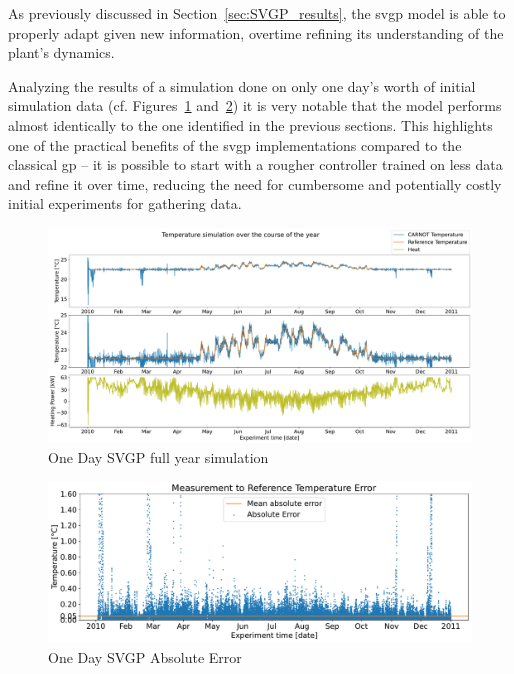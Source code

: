 As previously discussed in Section~\ref{sec:SVGP_results}, the \acrshort{svgp}
model is able to properly adapt given new information, overtime refining its
understanding of the plant's dynamics.

Analyzing the results of a simulation done on only one day's worth of initial
simulation data (cf. Figures~\ref{fig:SVGP_96pts_fullyear_simulation}
and~\ref{fig:SVGP_96pts_abserr}) it is very notable that the model performs
almost identically to the one identified in the previous sections. This
highlights one of the practical benefits of the \acrshort{svgp} implementations
compared to the classical \acrlong{gp} -- it is possible to start with a rougher
controller trained on less data and refine it over time, reducing the need for
cumbersome and potentially costly initial experiments for gathering data.

\begin{figure}[ht]
    \centering
    \includegraphics[width =
    \textwidth]{Plots/6_SVGP_96pts_inf_window_12_averageYear_fullyear.pdf}
    \caption{One Day SVGP full year simulation}
    \label{fig:SVGP_96pts_fullyear_simulation}
\end{figure}

\begin{figure}[ht]
    \centering
    \includegraphics[width =
    \textwidth]{Plots/6_SVGP_96pts_inf_window_12_averageYear_abserr.pdf}
    \caption{One Day SVGP Absolute Error}
    \label{fig:SVGP_96pts_abserr}
\end{figure}

